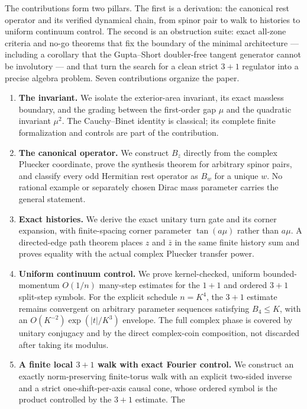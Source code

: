 \documentclass[11pt]{article}
\begin{document}
The contributions form two pillars.  The first is a derivation: the
canonical rest operator and its verified dynamical chain, from spinor pair
to walk to histories to uniform continuum control.  The second is an
obstruction suite: exact all-zone criteria and no-go theorems that fix the
boundary of the minimal architecture --- including a corollary that the
Gupta--Short doubler-free tangent generator cannot be involutory --- and that turn the search
for a clean strict $3+1$ regulator into a precise algebra problem.  Seven
contributions organize the paper.
\begin{enumerate}[leftmargin=2em]
  \item \textbf{The invariant.}  We isolate the exterior-area invariant, its
  exact massless boundary, and the grading between the first-order gap $\mu$
  and the quadratic invariant $\mu^2$.  The Cauchy--Binet identity is
  classical; its complete finite formalization and controls are part of the
  contribution.
  \item \textbf{The canonical operator.}  We construct $B_z$ directly from the
  complex Pluecker coordinate, prove the synthesis theorem for arbitrary
  spinor pairs, and classify every odd Hermitian rest operator as $B_w$ for a
  unique $w$.  No rational example or separately chosen Dirac mass parameter
  carries the general statement.
  \item \textbf{Exact histories.}  We derive the exact unitary turn gate and
  its corner expansion, with finite-spacing corner parameter $\tan(a\mu)$
  rather than $a\mu$.  A directed-edge path theorem places $z$ and $\bar z$ in
  the same finite history sum and proves equality with the actual complex
  Pluecker transfer power.
  \item \textbf{Uniform continuum control.}  We prove kernel-checked, uniform
  bounded-momentum $O(1/n)$ many-step estimates for the $1+1$ and ordered
  $3+1$ split-step symbols.  For the explicit schedule $n=K^4$, the $3+1$
  estimate remains convergent on arbitrary parameter sequences satisfying
  $B_4\leq K$, with an $O(K^{-2})\exp(|t|/K^3)$ envelope.  The full complex phase is covered by unitary
  conjugacy and by the direct complex-coin composition, not discarded after
  taking its modulus.
  \item \textbf{A finite local $3+1$ walk with exact Fourier control.}  We
  construct an exactly norm-preserving finite-torus walk with an explicit
  two-sided inverse and a strict one-shift-per-axis causal cone, whose ordered
  symbol is the product controlled by the $3+1$ estimate.  The

\end{enumerate}
\end{document}
